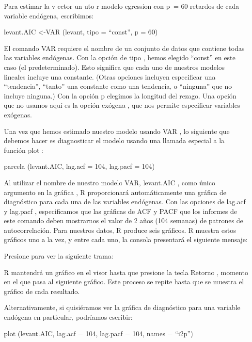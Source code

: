 \documentclass[
]{book}
\begin{document}
Para estimar la v ector un uto r modelo egression con p  = 60 retardos de cada variable endógena, escribimos:

levant.AIC \textless-VAR (levant, tipo = ``const'', p = 60)

El comando VAR requiere el nombre de un conjunto de datos que contiene todas las variables endógenas. Con la opción de tipo , hemos elegido ``const'' en este caso (el predeterminado). Esto significa que cada uno de nuestros modelos lineales incluye una constante. (Otras opciones incluyen especificar una ``tendencia'', ``tanto'' una constante como una tendencia, o ``ninguna'' que no incluye ninguna.) Con la opción p elegimos la longitud del rezago. Una opción que no usamos aquí es la opción exógena , que nos permite especificar variables exógenas.

Una vez que hemos estimado nuestro modelo usando VAR , lo siguiente que debemos hacer es diagnosticar el modelo usando una llamada especial a la función plot :

parcela (levant.AIC, lag.acf = 104, lag.pacf = 104)

Al utilizar el nombre de nuestro modelo VAR, levant.AIC , como único argumento en la gráfica , R proporcionará automáticamente una gráfica de diagnóstico para cada una de las variables endógenas. Con las opciones de lag.acf y lag.pacf , especificamos que las gráficas de ACF y PACF que los informes de este comando deben mostrarnos el valor de 2 años (104 semanas) de patrones de autocorrelación. Para nuestros datos, R produce seis gráficos. R muestra estos gráficos uno a la vez, y entre cada uno, la consola presentará el siguiente mensaje:

Presione para ver la siguiente trama:

R mantendrá un gráfico en el visor hasta que presione la tecla Retorno , momento en el que pasa al siguiente gráfico. Este proceso se repite hasta que se muestra el gráfico de cada resultado.

Alternativamente, si quisiéramos ver la gráfica de diagnóstico para una variable endógena en particular, podríamos escribir:

plot (levant.AIC, lag.acf = 104, lag.pacf = 104, names = ``i2p'')
\end{document}
